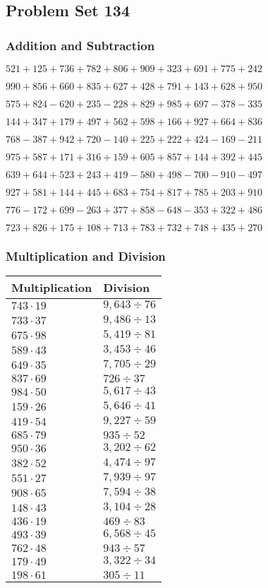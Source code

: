 \hypertarget{problem-set-134}{%
\subsection{Problem Set 134}\label{problem-set-134}}

\hypertarget{addition-and-subtraction}{%
\subsubsection{Addition and
Subtraction}\label{addition-and-subtraction}}

\(521 +125 +736 +782 +806 +909 +323 +691 +775 +242\)

\(990 +856 +660 +835 +627 +428 +791 +143 +628 +950\)

\(575 +824 - 620 +235 - 228 +829 +985 +697 - 378 - 335\)

\(144 +347 +179 +497 +562 +598 +166 +927 +664 +836\)

\(768 - 387 +942 +720 - 140 +225 +222 +424 - 169 - 211\)

\(975 +587 +171 +316 +159 +605 +857 +144 +392 +445\)

\(639 +644 +523 +243 +419 - 580 +498 - 700 - 910 - 497\)

\(927 +581 +144 +445 +683 +754 +817 +785 +203 +910\)

\(776 - 172 +699 - 263 +377 +858 - 648 - 353 +322 +486\)

\(723 +826 +175 +108 +713 +783 +732 +748 +435 +270\)

\hypertarget{multiplication-and-division}{%
\subsubsection{Multiplication and
Division}\label{multiplication-and-division}}

\begin{longtable}[]{@{}ll@{}}
\toprule
Multiplication & Division\tabularnewline
\midrule
\endhead
\(743 \cdot 19\) & \(9,643÷76\)\tabularnewline
\(733 \cdot 37\) & \(9,486÷13\)\tabularnewline
\(675 \cdot 98\) & \(5,419÷81\)\tabularnewline
\(589 \cdot 43\) & \(3,453÷46\)\tabularnewline
\(649 \cdot 35\) & \(7,705÷29\)\tabularnewline
\(837 \cdot 69\) & \(726÷37\)\tabularnewline
\(984 \cdot 50\) & \(5,617÷43\)\tabularnewline
\(159 \cdot 26\) & \(5,646÷41\)\tabularnewline
\(419 \cdot 54\) & \(9,227÷59\)\tabularnewline
\(685 \cdot 79\) & \(935÷52\)\tabularnewline
\(950 \cdot 36\) & \(3,202÷62\)\tabularnewline
\(382 \cdot 52\) & \(4,474÷97\)\tabularnewline
\(551 \cdot 27\) & \(7,939÷97\)\tabularnewline
\(908 \cdot 65\) & \(7,594÷38\)\tabularnewline
\(148 \cdot 43\) & \(3,104÷28\)\tabularnewline
\(436 \cdot 19\) & \(469÷83\)\tabularnewline
\(493 \cdot 39\) & \(6,568÷45\)\tabularnewline
\(762 \cdot 48\) & \(943÷57\)\tabularnewline
\(179 \cdot 49\) & \(3,322÷34\)\tabularnewline
\(198 \cdot 61\) & \(305÷11\)\tabularnewline
\bottomrule
\end{longtable}
